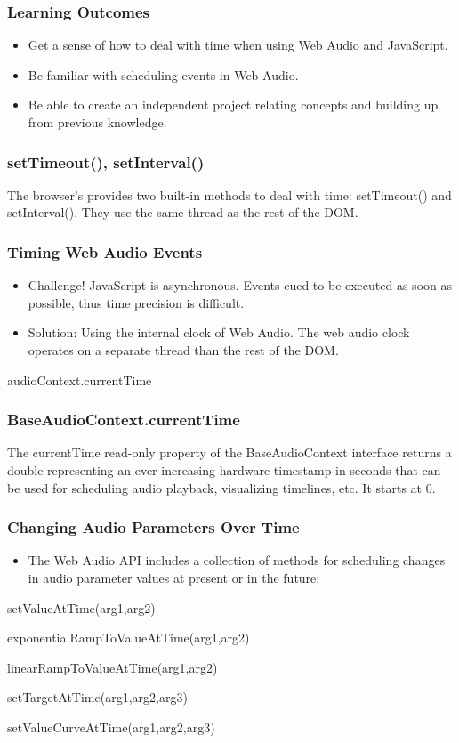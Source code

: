 \documentclass[screen, aspectratio=43]{beamer}
\begin{document}
%
\begin{frame}
\frametitle{Learning Outcomes}
\begin{itemize}
\item Get a sense of how to deal with time when using Web Audio and JavaScript.
\item Be familiar with scheduling events in Web Audio.
\item Be able to create an independent project relating concepts and building up from previous knowledge.
\end{itemize}
\end{frame}
%
\begin{frame}
\frametitle{setTimeout(), setInterval()}
The browser's provides two built-in methods to deal with time: \textrm{setTimeout()} and \textrm{setInterval()}. They use the same thread as the rest of the DOM.
\end{frame}
%
\begin{frame}
\frametitle{Timing Web Audio Events}
\begin{itemize}
\item Challenge! JavaScript is asynchronous. Events cued to be executed as soon as possible, thus time precision is difficult.
\item Solution: Using the internal clock of Web Audio. The web audio clock operates on a separate thread than the rest of the DOM.
\end{itemize}
\vspace{10 mm}
\centerline{\textrm{audioContext.currentTime}}
\end{frame}
%
\begin{frame}
\frametitle{BaseAudioContext.currentTime}
The \textrm{currentTime} read-only property of the BaseAudioContext interface returns a double representing an ever-increasing hardware timestamp in seconds that can be used for scheduling audio playback, visualizing timelines, etc. It starts at 0.
\end{frame}
%
\begin{frame}
\frametitle{Changing Audio Parameters Over Time}
\begin{itemize}
\item  The Web Audio API includes a collection of methods for scheduling changes in audio parameter values at present or in the future:
\end{itemize}
\vspace{10 mm}
\centerline{\textrm{setValueAtTime(arg1,arg2)}}
\centerline{\textrm{exponentialRampToValueAtTime(arg1,arg2)}}
\centerline{\textrm{linearRampToValueAtTime(arg1,arg2)}}
\centerline{\textrm{setTargetAtTime(arg1,arg2,arg3)}}
\centerline{\textrm{setValueCurveAtTime(arg1,arg2,arg3)}}
\end{frame}
\end{document}
